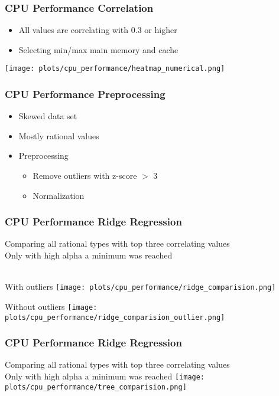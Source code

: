 \documentclass[aspectratio=169]{beamer}
\begin{document}
\begin{frame}{}
\frametitle{CPU Performance Correlation}
\begin{itemize}
	\item All values are correlating with 0.3 or higher
	\item Selecting min/max main memory and cache
\end{itemize}
    \center \texttt{[image: plots/cpu\_performance/heatmap\_numerical.png]}
\end{frame}

\begin{frame}{}
\frametitle{CPU Performance Preprocessing}
\begin{itemize}
\item Skewed data set
\item Mostly rational values
\item Preprocessing
\begin{itemize}
\item Remove outliers with z-score $>$ 3
\item Normalization
\end{itemize}
\end{itemize}
\end{frame}

\begin{frame}{}
\frametitle{CPU Performance Ridge Regression}
Comparing all rational types with top three correlating values \\
Only with high alpha a minimum was reached \\ ~\\

\begin{minipage}{0.49\textwidth}
\center With outliers
   \texttt{[image: plots/cpu\_performance/ridge\_comparision.png]}
\end{minipage}
 \begin{minipage}{0.49\textwidth}
 \center Without outliers
   \texttt{[image: plots/cpu\_performance/ridge\_comparision\_outlier.png]}
\end{minipage}
\end{frame}

\begin{frame}{}
\frametitle{CPU Performance Ridge Regression}
Comparing all rational types with top three correlating values\\Only with high alpha a minimum was reached
    \center \texttt{[image: plots/cpu\_performance/tree\_comparision.png]}
\end{frame}
\end{document}

